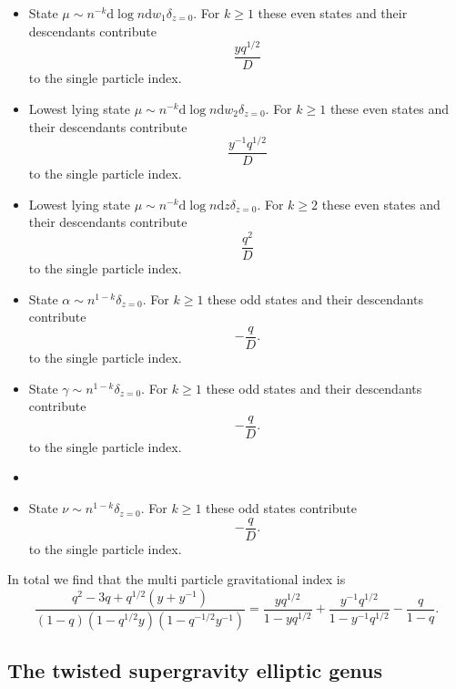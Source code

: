 \documentclass[11pt]{amsart}
\newcommand{\del}{\partial}
\renewcommand{\d}{\mathrm{d}}
\def\bu{{\bullet}}
\newcommand\beqn{\begin{equation}}
\newcommand\eeqn{\end{equation}}
\theoremstyle{thm}
\numberwithin{equation}{subsection}
\theoremstyle{def}
\theoremstyle{rem}
\begin{document}
\begin{itemize} 
\item State $\mu \sim n^{-k} \d \log n \d w_1 \delta_{z=0}$.
For $k \geq 1$ these even states and their descendants contribute
\beqn
\frac{y q^{1/2}}{D} 
\eeqn
to the single particle index. 
\item Lowest lying state $\mu \sim n^{-k} \d \log n \d w_2 \delta_{z=0}$.
For $k \geq 1$ these even states and their descendants contribute
\beqn
\frac{y^{-1} q^{1/2}}{D} 
\eeqn
to the single particle index. 
\item Lowest lying state $\mu \sim n^{-k} \d \log n \d z \delta_{z=0}$.
For $k \geq 2$ these even states and their descendants contribute 
\beqn
\frac{q^2}{D} 
\eeqn
to the single particle index. 
\item State $\alpha \sim n^{1-k}\delta_{z=0}$. 
For $k \geq 1$ these odd states and their descendants contribute 
\beqn
- \frac{q}{D} .
\eeqn
to the single particle index.
\item State $\gamma \sim n^{1-k}\delta_{z=0}$. 
For $k \geq 1$ these odd states and their descendants contribute 
\beqn
- \frac{q}{D} .
\eeqn
to the single particle index.
\item \item State $\nu \sim n^{1-k}\delta_{z=0}$. 
For $k \geq 1$ these odd states contribute 
\beqn
- \frac{q}{D} .
\eeqn
to the single particle index.
\end{itemize}

In total we find that the multi particle gravitational index is 
\beqn
\frac{q^2 - 3q + q^{1/2} (y+y^{-1})}{(1-q)(1-q^{1/2} y)(1-q^{-1/2}y^{-1})} = \frac{y q^{1/2}}{1-y q^{1/2}} + \frac{y^{-1} q^{1/2}}{1-y^{-1}  q^{1/2}} - \frac{q}{1-q} .
\eeqn



%

\subsection{The twisted supergravity elliptic genus}
\end{document}
